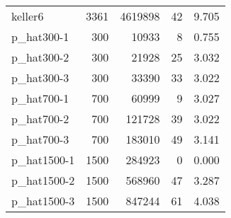\begin{table}[!htbp]
{\begin{tabular}{|l|r|r|r|r|}
keller6 & 3361 & 4619898 & 42 & 9.705 \\
p_hat300-1 & 300 & 10933 & 8 & 0.755 \\
p_hat300-2 & 300 & 21928 & 25 & 3.032 \\
p_hat300-3 & 300 & 33390 & 33 & 3.022 \\
p_hat700-1 & 700 & 60999 & 9 & 3.027 \\
p_hat700-2 & 700 & 121728 & 39 & 3.022 \\
p_hat700-3 & 700 & 183010 & 49 & 3.141 \\
p_hat1500-1 & 1500 & 284923 & 0 & 0.000 \\
p_hat1500-2 & 1500 & 568960 & 47 & 3.287 \\
p_hat1500-3 & 1500 & 847244 & 61 & 4.038 \\
\hline
\end{tabular}%
}
\end{table}
